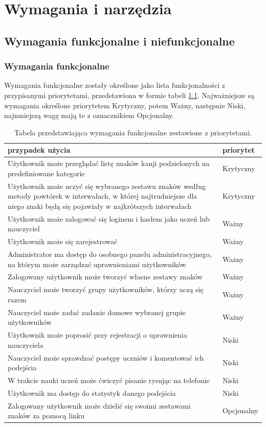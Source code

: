\documentclass[a4paper,twoside,12pt]{book}
\begin{document}
\chapter{Wymagania i narzędzia}
\label{ch:wymagania-i-narzedzia}

\section{Wymagania funkcjonalne i niefunkcjonalne}

\subsection{Wymagania funkcjonalne}

Wymagania funkcjonalne zostały określone jako lista funkcjonalności z przypisanymi priorytetami, przedstawiona w formie tabeli \ref{id:tab:wymagania}. Najważniejsze są wymagania określone priorytetem Krytyczny, potem Ważny, następnie Niski, najmniejszą wagę mają te z oznacznikiem Opcjonalny. 

\begin{table}[] 
\centering
\caption{Tabela przedstawiająca wymagania funkcjonalne zestawione z priorytetami.}
\label{id:tab:wymagania}
\begin{tabular}{p{}|p{}}
przypadek użycia & priorytet \\ \hline
Użytkownik może przeglądać listę znaków kanji podzielonych na predefiniowane kategorie  &  Krytyczny   \\
Użytkownik może uczyć się wybranego zestawu znaków według metody powtórek w interwałach, w której najtrudniejsze dla niego znaki będą się pojawiały w najkrótszych interwałach & Krytyczny \\
Użytkownik może zalogować się loginem i hasłem jako uczeń lub nauczyciel & Ważny \\
Użytkownik może się zarejestrować & Ważny \\
Administrator ma dostęp do osobnego panelu administracyjnego, na którym może zarządzać uprawnieniami użytkowników & Ważny \\
Zalogowany użytkownik może tworzyć własne zestawy znaków & Ważny \\
Nauczyciel może tworzyć grupy użytkowników, którzy uczą się razem & Ważny \\
Nauczyciel może zadać zadanie domowe wybranej grupie użytkowników & Ważny \\
Użytkownik może poprosić przy rejestracji o uprawnienia nauczyciela & Niski \\
Nauczyciel może sprawdzać postępy uczniów i komentować ich podejścia & Niski \\
W trakcie nauki uczeń może ćwiczyć pisanie rysując na telefonie & Niski \\
Użytkownik ma dostęp do statystyk danego podejścia & Niski \\
Zalogowany użytkownik może dzielić się swoimi zestawami znaków za pomocą linku & Opcjonalny \\
\end{tabular}
\end{table}
\end{document}
